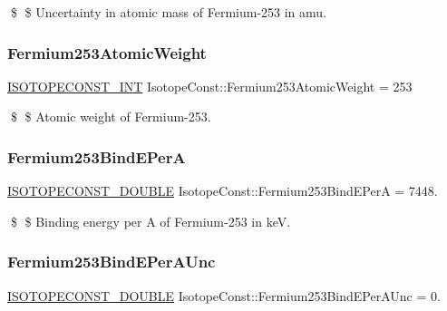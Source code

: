 \$ \$ Uncertainty in atomic mass of Fermium-\/253 in amu. \mbox{\label{group___isotope_const-_fermium-_fm253_ga6766174f7ad0b8c51c5e8bbc10289626}} 
\subsubsection{\texorpdfstring{Fermium253\+Atomic\+Weight}{Fermium253AtomicWeight}}
{\footnotesize\ttfamily \mbox{\hyperlink{group___isotope_const-_macros_ga5f18360b3e99483a35c32d789e62621c}{I\+S\+O\+T\+O\+P\+E\+C\+O\+N\+S\+T\+\_\+\+I\+NT}} Isotope\+Const\+::\+Fermium253\+Atomic\+Weight = 253}

\$ \$ Atomic weight of Fermium-\/253. \mbox{\label{group___isotope_const-_fermium-_fm253_gacef604b154b35c203f6ba2bc577a975e}} 
\subsubsection{\texorpdfstring{Fermium253\+Bind\+E\+PerA}{Fermium253BindEPerA}}
{\footnotesize\ttfamily \mbox{\hyperlink{group___isotope_const-_macros_ga8f45a7272ce02c0b4c65c44636ed719a}{I\+S\+O\+T\+O\+P\+E\+C\+O\+N\+S\+T\+\_\+\+D\+O\+U\+B\+LE}} Isotope\+Const\+::\+Fermium253\+Bind\+E\+PerA = 7448.}

\$ \$ Binding energy per A of Fermium-\/253 in keV. \mbox{\label{group___isotope_const-_fermium-_fm253_ga8e3e97225f18df7dbd4ea5fbf63e5937}} 
\subsubsection{\texorpdfstring{Fermium253\+Bind\+E\+Per\+A\+Unc}{Fermium253BindEPerAUnc}}
{\footnotesize\ttfamily \mbox{\hyperlink{group___isotope_const-_macros_ga8f45a7272ce02c0b4c65c44636ed719a}{I\+S\+O\+T\+O\+P\+E\+C\+O\+N\+S\+T\+\_\+\+D\+O\+U\+B\+LE}} Isotope\+Const\+::\+Fermium253\+Bind\+E\+Per\+A\+Unc = 0.}

